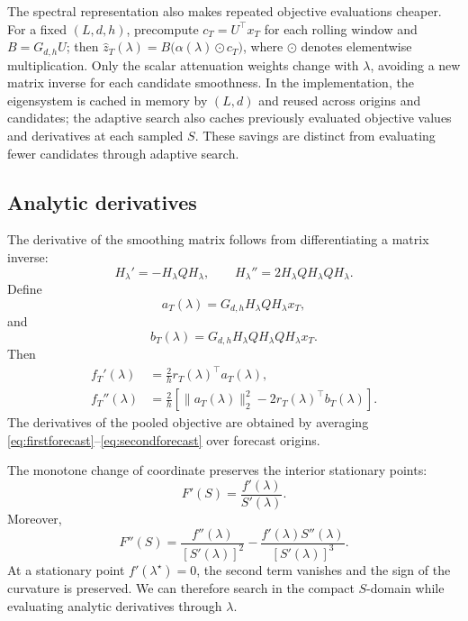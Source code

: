 \documentclass[english]{smcca}
\begin{document}
The spectral representation also makes repeated objective evaluations cheaper.
For a fixed $(L,d,h)$, precompute $c_T=U^\top x_T$ for each rolling window
and $B=G_{d,h}U$; then
$\widehat z_T(\lambda)=B\bigl(\alpha(\lambda)\odot c_T\bigr)$,
where $\odot$ denotes elementwise multiplication. Only the scalar
attenuation weights change with $\lambda$, avoiding a new matrix inverse
for each candidate smoothness. In the implementation, the eigensystem
is cached in memory by $(L,d)$ and reused across origins and candidates;
the adaptive search also caches previously evaluated objective values and
derivatives at each sampled $S$. These savings are distinct from evaluating
fewer candidates through adaptive search.

\subsection{Analytic derivatives}

The derivative of the smoothing matrix follows from differentiating a matrix inverse:
\[
H_\lambda'
=
-H_\lambda QH_\lambda,
\qquad
H_\lambda''
=
2H_\lambda QH_\lambda QH_\lambda.
\]
Define
\[
a_T(\lambda)
=
G_{d,h}H_\lambda QH_\lambda x_T,
\]
and
\[
b_T(\lambda)
=
G_{d,h}H_\lambda QH_\lambda QH_\lambda x_T.
\]
Then
\begin{align}
f_T'(\lambda)
&=
\frac{2}{h}r_T(\lambda)^\top a_T(\lambda),
\label{eq:firstforecast}
\\
f_T''(\lambda)
&=
\frac{2}{h}
\left[
\|a_T(\lambda)\|_2^2
-
2r_T(\lambda)^\top b_T(\lambda)
\right].
\label{eq:secondforecast}
\end{align}
The derivatives of the pooled objective are obtained by averaging \eqref{eq:firstforecast}--\eqref{eq:secondforecast} over forecast origins.

The monotone change of coordinate preserves the interior stationary points:
\begin{equation}
F'(S)
=
\frac{f'(\lambda)}{S'(\lambda)}.
\label{eq:chainfirst}
\end{equation}
Moreover,
\begin{equation}
F''(S)
=
\frac{f''(\lambda)}{[S'(\lambda)]^2}
-
\frac{f'(\lambda)S''(\lambda)}{[S'(\lambda)]^3}.
\label{eq:chainsecond}
\end{equation}
At a stationary point \(f'(\lambda^\star)=0\), the second term vanishes and the sign of the curvature is preserved. We can therefore search in the compact \(S\)-domain while evaluating analytic derivatives through \(\lambda\).
\end{document}
